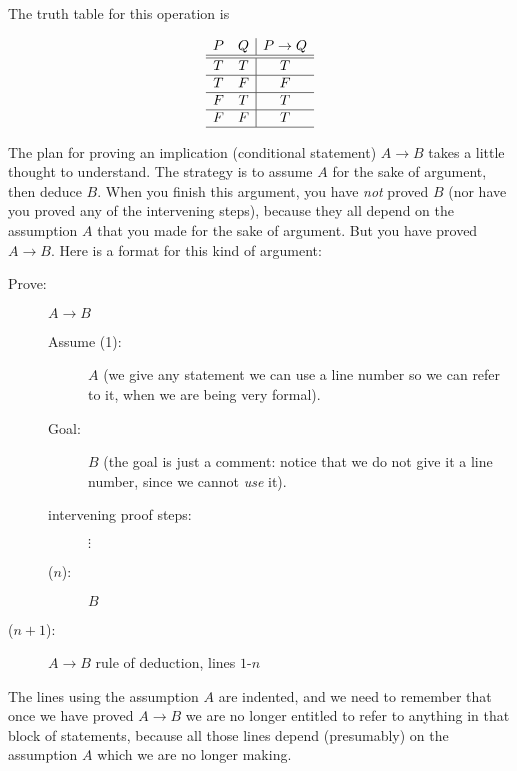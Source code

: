 \documentclass[12pt]{article}
\begin{document}
The truth table for this operation is

$$\begin{array}{cc|c}

P & Q & P \rightarrow Q \\ \hline \hline

T & T & T \\ \hline
T & F & F \\ \hline
F & T & T \\ \hline
F & F & T \\ \hline

\end{array}$$

The plan for proving an implication (conditional statement) $A \rightarrow B$ takes a little thought to understand.  The strategy is to assume $A$ for the sake of argument,
then deduce $B$.  When you finish this argument, you have {\em not\/} proved $B$ (nor have you proved any of the intervening steps), because they all depend on the assumption $A$ that you made for the sake of argument.  But you have proved $A \rightarrow B$.  Here is a format for this kind of argument:

\begin{description}

\item[Prove:]  $A \rightarrow B$

\begin{description}

\item[Assume (1):]  $A$  (we give any statement we can use a line number so we can refer to it, when we are being very formal).

\item[Goal:]  $B$ (the goal is just a comment:  notice that we do not give it a line number, since we cannot {\em use\/} it).

\item[intervening proof steps:]  $\vdots$

\item[($n$):]  $B$

\end{description}

\item[($n+1$):]  $A \rightarrow B$ rule of deduction, lines $1$-$n$

\end{description}

The lines using the assumption $A$ are indented, and we need to remember that once we have proved $A \rightarrow B$ we are no longer entitled to refer to anything in that block of statements, because all those lines depend (presumably) on the assumption $A$ which we are no longer making.
\end{document}
